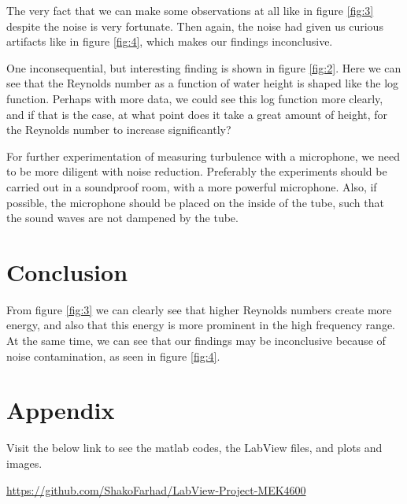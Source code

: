 \documentclass[english,a4paper,12pt]{article}
\begin{document}
The very fact that we can make some observations at all like in figure \ref{fig:3} despite the noise is very fortunate. Then again, the noise had given us curious artifacts like in figure \ref{fig:4}, which makes our findings inconclusive.\bigskip

One inconsequential, but interesting finding is shown in figure \ref{fig:2}. Here we can see that the Reynolds number as a function of water height is shaped like the log function. Perhaps with more data, we could see this log function more clearly, and if that is the case, at what point does it take a great amount of height, for the Reynolds number to increase significantly? \bigskip

For further experimentation of measuring turbulence with a microphone, we need to be more diligent with noise reduction. Preferably the experiments should be carried out in a soundproof room, with a more powerful microphone. Also, if possible, the microphone should be placed on the inside of the tube, such that the sound waves are not dampened by the tube.

\section*{Conclusion}
From figure \ref{fig:3} we can clearly see that higher Reynolds numbers create more energy, and also that this energy is more prominent in the high frequency range. At the same time, we can see that our findings may be inconclusive because of noise contamination, as seen in figure \ref{fig:4}.

\section*{Appendix}
Visit the below link to see the matlab codes, the LabView files, and plots and images.

\url{https://github.com/ShakoFarhad/LabView-Project-MEK4600}


 \bigskip \bigskip
\end{document}
